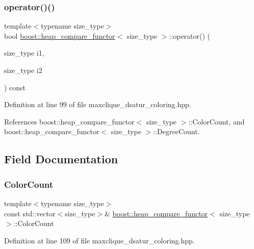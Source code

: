 \subsubsection{\texorpdfstring{operator()()}{operator()()}}
{\footnotesize\ttfamily template$<$typename size\+\_\+type$>$ \\
bool \hyperlink{structboost_1_1heap__compare__functor}{boost\+::heap\+\_\+compare\+\_\+functor}$<$ size\+\_\+type $>$\+::operator() (\begin{DoxyParamCaption}\item[{size\+\_\+type}]{i1,  }\item[{size\+\_\+type}]{i2 }\end{DoxyParamCaption}) const\hspace{0.3cm}{\ttfamily [inline]}}



Definition at line 99 of file maxclique\+\_\+dsatur\+\_\+coloring.\+hpp.



References boost\+::heap\+\_\+compare\+\_\+functor$<$ size\+\_\+type $>$\+::\+Color\+Count, and boost\+::heap\+\_\+compare\+\_\+functor$<$ size\+\_\+type $>$\+::\+Degree\+Count.



\subsection{Field Documentation}
\mbox{\label{structboost_1_1heap__compare__functor_a69c068ccbfb302b79492da20236f8783}} 
\subsubsection{\texorpdfstring{Color\+Count}{ColorCount}}
{\footnotesize\ttfamily template$<$typename size\+\_\+type$>$ \\
const std\+::vector$<$size\+\_\+type$>$\& \hyperlink{structboost_1_1heap__compare__functor}{boost\+::heap\+\_\+compare\+\_\+functor}$<$ size\+\_\+type $>$\+::Color\+Count\hspace{0.3cm}{\ttfamily [private]}}



Definition at line 109 of file maxclique\+\_\+dsatur\+\_\+coloring.\+hpp.




